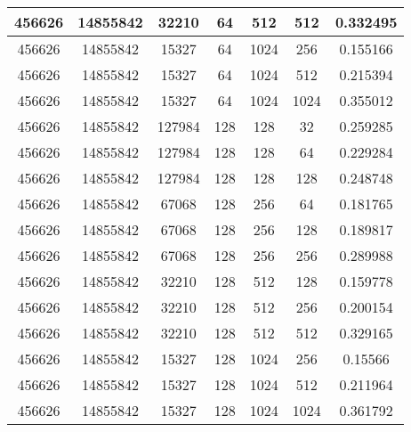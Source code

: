 \documentclass[9pt]{article}
\begin{document}
\begin{tabular}{|c|c|c|c|c|c|c| }
\hline
456626  & 14855842  & 32210  & 64  & 512  & 512  & 0.332495 \\
\hline
456626  & 14855842  & 15327  & 64  & 1024  & 256  & 0.155166 \\
\hline
456626  & 14855842  & 15327  & 64  & 1024  & 512  & 0.215394 \\
\hline
456626  & 14855842  & 15327  & 64  & 1024  & 1024  & 0.355012 \\
\hline
456626  & 14855842  & 127984  & 128  & 128  & 32  & 0.259285 \\
\hline
456626  & 14855842  & 127984  & 128  & 128  & 64  & 0.229284 \\
\hline
456626  & 14855842  & 127984  & 128  & 128  & 128  & 0.248748 \\
\hline
456626  & 14855842  & 67068  & 128  & 256  & 64  & 0.181765 \\
\hline
456626  & 14855842  & 67068  & 128  & 256  & 128  & 0.189817 \\
\hline
456626  & 14855842  & 67068  & 128  & 256  & 256  & 0.289988 \\
\hline
456626  & 14855842  & 32210  & 128  & 512  & 128  & 0.159778 \\
\hline
456626  & 14855842  & 32210  & 128  & 512  & 256  & 0.200154 \\
\hline
456626  & 14855842  & 32210  & 128  & 512  & 512  & 0.329165 \\
\hline
456626  & 14855842  & 15327  & 128  & 1024  & 256  & 0.15566 \\
\hline
456626  & 14855842  & 15327  & 128  & 1024  & 512  & 0.211964 \\
\hline
456626  & 14855842  & 15327  & 128  & 1024  & 1024  & 0.361792 \\
\hline
\end{tabular}
 
\end{document}
